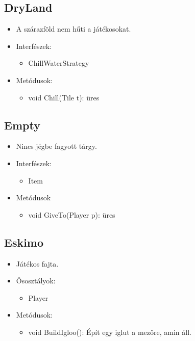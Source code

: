 \subsection{DryLand}
\begin{itemize}
	\item A szárazföld nem hűti a játékosokat.	
	\item Interfészek:
	\begin{itemize}
		\item ChillWaterStrategy
	\end{itemize}
	\item Metódusok:
	\begin{itemize}
		\item void Chill(Tile t): üres
	\end{itemize}
\end{itemize}

\subsection{Empty}
\begin{itemize}
	\item Nincs jégbe fagyott tárgy.	
	\item Interfészek:
	\begin{itemize}
		\item Item
	\end{itemize}
	\item Metódusok
	\begin{itemize}
		\item void GiveTo(Player p): üres
	\end{itemize}
\end{itemize}

\subsection{Eskimo}
\begin{itemize}
	\item Játékos fajta.	
	\item Ősosztályok:
	\begin{itemize}
		\item Player
	\end{itemize}
	\item Metódusok:
	\begin{itemize}
	\item void BuildIgloo(): Épít egy iglut a mezőre, amin áll.
	\end{itemize}
\end{itemize}

